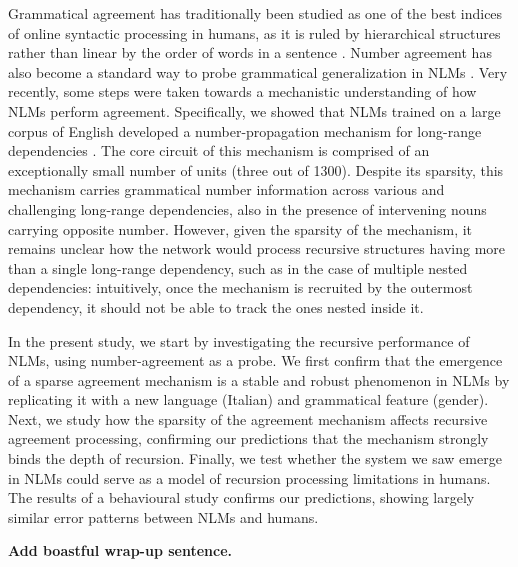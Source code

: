 Grammatical agreement has traditionally been studied as one of the
best indices of online syntactic processing in humans, as it is ruled
by hierarchical structures rather than linear by the order of words in
a sentence \citep{Bock:Miller:1991, franck2002subject}. Number
agreement has also become a standard way to probe grammatical
generalization in NLMs
\citep{Linzen:etal:2016,Bernardy:Lappin:2017,Giulianelli:etal:2018,Gulordava:etal:2018}. Very
recently, some steps were taken towards a mechanistic understanding of
how NLMs perform agreement. Specifically, we showed that NLMs trained
on a large corpus of English developed a number-propagation mechanism
for long-range dependencies \citep{lakretz2019emergence}. The core
circuit of this mechanism is comprised of an exceptionally small
number of units (three out of 1300). Despite its sparsity, this
mechanism carries grammatical number information across various and
challenging long-range dependencies, also in the presence of
intervening nouns carrying opposite number. However, given the
sparsity of the mechanism, it remains unclear how the network would
process recursive structures having more than a single long-range
dependency, such as in the case of multiple nested dependencies:
intuitively, once the mechanism is recruited by the outermost
dependency, it should not be able to track the ones nested inside it.

In the present study, we start by investigating the recursive
performance of NLMs, using number-agreement as a
probe. We first confirm that the emergence of a sparse agreement mechanism is
a stable and robust phenomenon in NLMs by replicating it with a new
language (Italian) and grammatical feature (gender). Next, we study
how the sparsity of the agreement mechanism affects recursive
agreement processing, confirming our predictions that the mechanism
strongly binds the depth of recursion. Finally, we test whether the
 system we saw emerge in NLMs could serve as a
model of recursion processing limitations in humans. The results of a
behavioural study confirms our predictions, showing largely similar
error patterns between NLMs and humans.

\textbf{Add boastful wrap-up sentence.}

